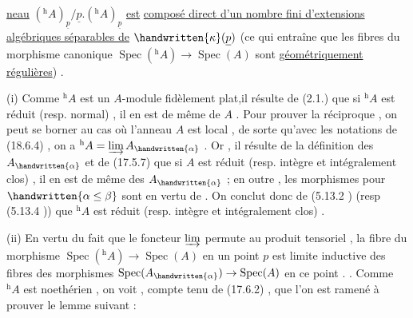 \uline{neau} $({}^{\mathrm h}A)_{\underline p}/\underline p.({}^{\mathrm h}A)_{\underline p}$ \uline{est}  \uline{composé direct d'un nombre fini d'extensions
algébriques séparables de} $\handwritten{\kappa}(\underline p)$ (ce qui entraîne que les fibres du morphisme
canonique $\operatorname{Spec}({}^{\mathrm h}A)\to\operatorname{Spec}(A)$ sont \uline{géométriquement régulières}) .

(i) Comme $ {}^{\mathrm h}A$ est un $A$-module fidèlement plat,il résulte de (2.1.) que si
$ {}^{\mathrm h}A$ est  réduit (resp. normal) , il en est de même de $A$ . Pour prouver la
réciproque , on peut se borner au cas où l'anneau $A$ est local , de sorte 
qu'avec les notations de (18.6.4) , on a $ {}^{\mathrm h}A=\varinjlim A_{\handwritten{\alpha}}$ . Or , il résulte de la
définition des $A_{\handwritten{\alpha}}$ et de (17.5.7) que si $A$ est réduit (resp. intègre et intégralement
clos) , il en est de même des $A_{\handwritten{\alpha}}$ ;  en outre , les  morphismes   pour $\handwritten{\alpha\leq\beta}$
sont   en vertu de \inserted{\handwritten{\unsure{----}}} . On conclut donc de (5.13.2 ) (resp
(5.13.4 )) que $ {}^{\mathrm h}A$ est réduit (resp. intègre et intégralement clos) .

(ii)  En vertu du fait que le foncteur $\varinjlim$ permute au produit tensoriel ,
la fibre du morphisme $\operatorname{Spec}({}^{\mathrm h}A)\to\operatorname{Spec}(A)$ en un point $p$ est limite inductive
des fibres des morphismes $\operatorname{Spec}(A_{\handwritten{\alpha}})\to\operatorname{Spec}(A)$ en ce point . . Comme $ {}^{\mathrm h}A$ est
noethérien , on voit , compte tenu de (17.6.2) , que l'on est ramené à prouver
le lemme suivant :


